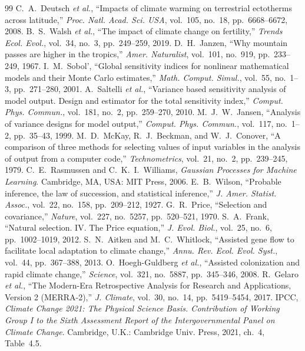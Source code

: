 \documentclass[conference]{IEEEtran}
\begin{document}
\begin{thebibliography}{99}
 C.~A.~Deutsch \emph{et al.}, ``Impacts of climate warming on terrestrial ectotherms across latitude,'' \emph{Proc. Natl. Acad. Sci. USA}, vol.~105, no.~18, pp.~6668--6672, 2008.
 B.~S.~Walsh \emph{et al.}, ``The impact of climate change on fertility,'' \emph{Trends Ecol. Evol.}, vol.~34, no.~3, pp.~249--259, 2019.
 D.~H.~Janzen, ``Why mountain passes are higher in the tropics,'' \emph{Amer. Naturalist}, vol.~101, no.~919, pp.~233--249, 1967.
 I.~M.~Sobol', ``Global sensitivity indices for nonlinear mathematical models and their Monte Carlo estimates,'' \emph{Math. Comput. Simul.}, vol.~55, no.~1--3, pp.~271--280, 2001.
 A.~Saltelli \emph{et al.}, ``Variance based sensitivity analysis of model output. Design and estimator for the total sensitivity index,'' \emph{Comput. Phys. Commun.}, vol.~181, no.~2, pp.~259--270, 2010.
 M.~J.~W.~Jansen, ``Analysis of variance designs for model output,'' \emph{Comput. Phys. Commun.}, vol.~117, no.~1--2, pp.~35--43, 1999.
 M.~D.~McKay, R.~J.~Beckman, and W.~J.~Conover, ``A comparison of three methods for selecting values of input variables in the analysis of output from a computer code,'' \emph{Technometrics}, vol.~21, no.~2, pp.~239--245, 1979.
 C.~E.~Rasmussen and C.~K.~I.~Williams, \emph{Gaussian Processes for Machine Learning}. Cambridge, MA, USA: MIT Press, 2006.
 E.~B.~Wilson, ``Probable inference, the law of succession, and statistical inference,'' \emph{J. Amer. Statist. Assoc.}, vol.~22, no.~158, pp.~209--212, 1927.
 G.~R.~Price, ``Selection and covariance,'' \emph{Nature}, vol.~227, no.~5257, pp.~520--521, 1970.
 S.~A.~Frank, ``Natural selection. IV. The Price equation,'' \emph{J. Evol. Biol.}, vol.~25, no.~6, pp.~1002--1019, 2012.
 S.~N.~Aitken and M.~C.~Whitlock, ``Assisted gene flow to facilitate local adaptation to climate change,'' \emph{Annu. Rev. Ecol. Evol. Syst.}, vol.~44, pp.~367--388, 2013.
 O.~Hoegh-Guldberg \emph{et al.}, ``Assisted colonization and rapid climate change,'' \emph{Science}, vol.~321, no.~5887, pp.~345--346, 2008.
 R.~Gelaro \emph{et al.}, ``The Modern-Era Retrospective Analysis for Research and Applications, Version 2 (MERRA-2),'' \emph{J. Climate}, vol.~30, no.~14, pp.~5419--5454, 2017.
 IPCC, \emph{Climate Change 2021: The Physical Science Basis. Contribution of Working Group I to the Sixth Assessment Report of the Intergovernmental Panel on Climate Change}. Cambridge, U.K.: Cambridge Univ. Press, 2021, ch.~4, Table~4.5.
\end{thebibliography}
\end{document}
